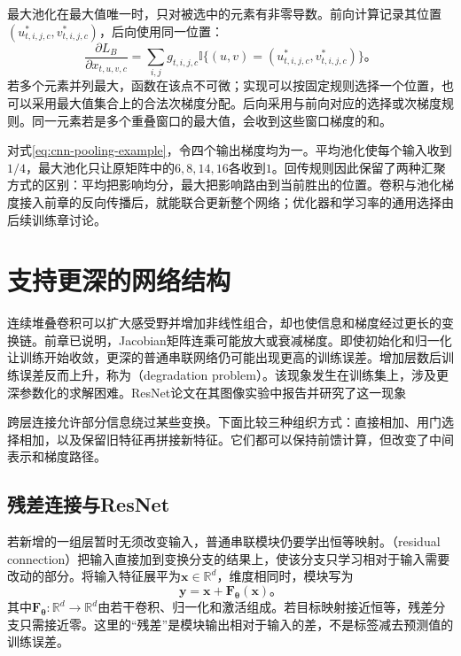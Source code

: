 最大池化在最大值唯一时，只对被选中的元素有非零导数。前向计算记录其位置$(u^*_{t,i,j,c},v^*_{t,i,j,c})$，后向使用同一位置：
\begin{equation}
  \frac{\partial L_B}{\partial x_{t,u,v,c}}
  =\sum_{i,j}g_{t,i,j,c}
       \mathbb I\{(u,v)=(u^*_{t,i,j,c},v^*_{t,i,j,c})\}\text{。}
  \label{eq:cnn-max-pooling-gradient}
\end{equation}
若多个元素并列最大，函数在该点不可微；实现可以按固定规则选择一个位置，也可以采用最大值集合上的合法次梯度分配。后向采用与前向对应的选择或次梯度规则。同一元素若是多个重叠窗口的最大值，会收到这些窗口梯度的和。

对式\eqref{eq:cnn-pooling-example}，令四个输出梯度均为一。平均池化使每个输入收到$1/4$，最大池化只让原矩阵中的$6,8,14,16$各收到$1$。回传规则因此保留了两种汇聚方式的区别：平均把影响均分，最大把影响路由到当前胜出的位置。卷积与池化梯度接入前章的反向传播后，就能联合更新整个网络；优化器和学习率的通用选择由后续训练章讨论。

\section{支持更深的网络结构}
\label{sec:cnn-deep-structures}

连续堆叠卷积可以扩大感受野并增加非线性组合，却也使信息和梯度经过更长的变换链。前章已说明，Jacobian矩阵连乘可能放大或衰减梯度。即使初始化和归一化让训练开始收敛，更深的普通串联网络仍可能出现更高的训练误差。增加层数后训练误差反而上升，称为（degradation problem）。该现象发生在训练集上，涉及更深参数化的求解困难。ResNet论文在其图像实验中报告并研究了这一现象

跨层连接允许部分信息绕过某些变换。下面比较三种组织方式：直接相加、用门选择相加，以及保留旧特征再拼接新特征。它们都可以保持前馈计算，但改变了中间表示和梯度路径。

\subsection{残差连接与ResNet}
\label{sec:cnn-resnet}

若新增的一组层暂时无须改变输入，普通串联模块仍要学出恒等映射。（residual connection）把输入直接加到变换分支的结果上，使该分支只学习相对于输入需要改动的部分。将输入特征展平为$\bm x\in\mathbb R^d$，维度相同时，模块写为
\begin{equation}
  \bm y=\bm x+\bm F_{\bm\theta}(\bm x)\text{。}
  \label{eq:cnn-residual-block}
\end{equation}
其中$\bm F_{\bm\theta}:\mathbb R^d\to\mathbb R^d$由若干卷积、归一化和激活组成。若目标映射接近恒等，残差分支只需接近零。这里的“残差”是模块输出相对于输入的差，不是标签减去预测值的训练误差。

